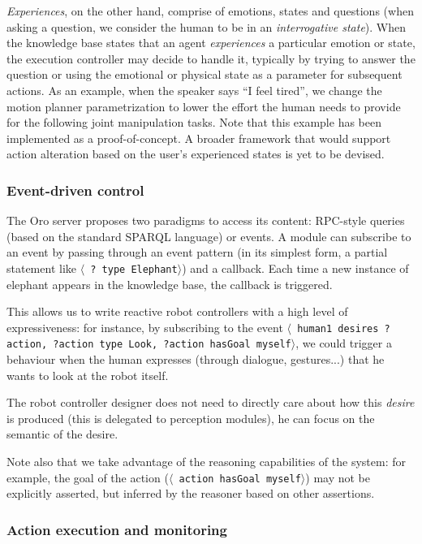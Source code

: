 \documentclass[preprint,3p,times]{elsarticle}
\newcommand{\stmt}[1]{{\footnotesize \tt $\langle$ #1\relax$\rangle$}}
\begin{document}
\emph{Experiences}, on the other hand, comprise of emotions, states and
questions (when asking a question, we consider the human to be in an
\emph{interrogative state}). When the knowledge base states that an agent
\emph{experiences} a particular emotion or state, the execution controller may
decide to handle it, typically by trying to answer the question or using the
emotional or physical state as a parameter for subsequent actions. As an
example, when the speaker says ``I feel tired'', we change the motion planner
parametrization to lower the effort the human needs to provide for the
following joint manipulation tasks. Note that this example has been implemented
as a proof-of-concept. A broader framework that would support action alteration
based on the user's experienced states is yet to be devised.

\subsubsection{Event-driven control}

The {\sc Oro} server proposes two paradigms to access its content: RPC-style
queries (based on the standard SPARQL language) or events. A module can
subscribe to an event by passing through an event pattern (in its simplest
form, a partial statement like \stmt{? type Elephant}) and a callback.  Each
time a new instance of elephant appears in the knowledge base, the callback is
triggered.

This allows us to write reactive robot controllers with a high level of
expressiveness: for instance, by subscribing to the event \stmt{human1 desires
?action, ?action type Look, ?action hasGoal myself}, we could trigger a
behaviour when the human expresses (through dialogue, gestures...) that he
wants to look at the robot itself.

The robot controller designer does not need to directly care about how this
\emph{desire} is produced (this is delegated to perception modules), he can
focus on the semantic of the desire.

Note also that we take advantage of the reasoning capabilities of the system:
for example, the goal of the action (\stmt{action hasGoal myself}) may not be
explicitly asserted, but inferred by the reasoner based on other assertions.

\subsubsection{Action execution and monitoring}\label{sec:action}
\end{document}
